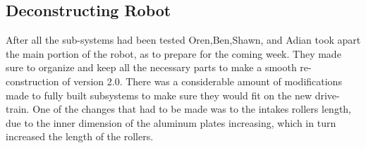 \documentclass{article}
\begin{document}
\subsection{Deconstructing Robot}
After all the sub-systems had been tested Oren,Ben,Shawn, and Adian took apart the main portion of the robot, as to prepare for the coming week. They made sure to organize and keep all the necessary parts to make a smooth re-construction of version 2.0. There was a considerable amount of modifications made to fully built subsystems to make sure they would fit on the new drive-train. One of the changes that had to be made was to the intakes rollers length, due to the inner dimension of the aluminum plates increasing, which in turn increased the length of the rollers. 
\end{document}
